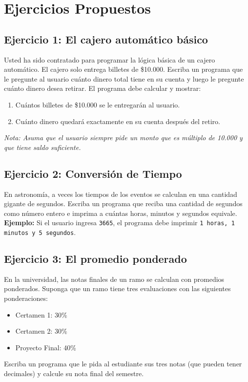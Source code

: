 \documentclass[11pt, a4paper]{article}
\begin{document}
	\vspace{0.5cm}
	
	\newpage
	\section{Ejercicios Propuestos}
	
	\subsection*{Ejercicio 1: El cajero automático básico}
	
	Usted ha sido contratado para programar la lógica básica de un cajero automático. El cajero solo entrega billetes de \$10.000. 
	Escriba un programa que le pregunte al usuario cuánto dinero total tiene en su cuenta y luego le pregunte cuánto dinero desea retirar. 
	El programa debe calcular y mostrar:
	\begin{enumerate}
		\item Cuántos billetes de \$10.000 se le entregarán al usuario.
		\item Cuánto dinero quedará exactamente en su cuenta después del retiro.
	\end{enumerate}
	\textit{Nota: Asuma que el usuario siempre pide un monto que es múltiplo de 10.000 y que tiene saldo suficiente.}
	
	
	\subsection*{Ejercicio 2: Conversión de Tiempo}
	
	En astronomía, a veces los tiempos de los eventos se calculan en una cantidad gigante de segundos. 
	Escriba un programa que reciba una cantidad de segundos como número entero e imprima a cuántas horas, minutos y segundos equivale.
	\\
	\textbf{Ejemplo:} Si el usuario ingresa \texttt{3665}, el programa debe imprimir \texttt{1 horas, 1 minutos y 5 segundos}.
	
	
	\subsection*{Ejercicio 3: El promedio ponderado}
	
	En la universidad, las notas finales de un ramo se calculan con promedios ponderados. Suponga que un ramo tiene tres evaluaciones con las siguientes ponderaciones:
	\begin{itemize}
		\item Certamen 1: 30\%
		\item Certamen 2: 30\%
		\item Proyecto Final: 40\%
	\end{itemize}
	Escriba un programa que le pida al estudiante sus tres notas (que pueden tener decimales) y calcule su nota final del semestre.
	
\end{document}
